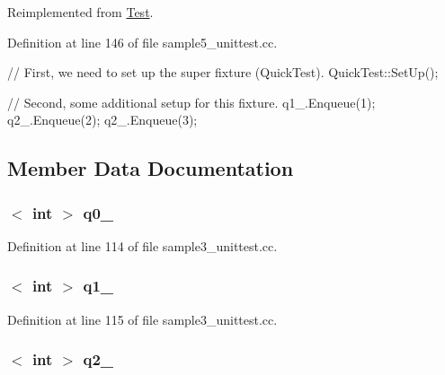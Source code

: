 \-Reimplemented from \hyperlink{classtesting_1_1Test_a1b06560e0e01a806b92c2386220d0b57}{\-Test}.



\-Definition at line 146 of file sample5\-\_\-unittest.\-cc.


\begin{DoxyCode}
                       {
    // First, we need to set up the super fixture (QuickTest).
    QuickTest::SetUp();

    // Second, some additional setup for this fixture.
    q1_.Enqueue(1);
    q2_.Enqueue(2);
    q2_.Enqueue(3);
  }
\end{DoxyCode}


\subsection{\-Member \-Data \-Documentation}
\hypertarget{classQueueTest_a2dcfad38001f7e4ec3072c6a7165070d}{
\subsubsection[{q0\-\_\-}]{$<$ int $>$ {\bf q0\-\_\-}}}\label{dc/d3d/classQueueTest_a2dcfad38001f7e4ec3072c6a7165070d}


\-Definition at line 114 of file sample3\-\_\-unittest.\-cc.

\hypertarget{classQueueTest_ab467b210bbd552ad64f773c8a91fef7d}{
\subsubsection[{q1\-\_\-}]{$<$ int $>$ {\bf q1\-\_\-}}}\label{dc/d3d/classQueueTest_ab467b210bbd552ad64f773c8a91fef7d}


\-Definition at line 115 of file sample3\-\_\-unittest.\-cc.

\hypertarget{classQueueTest_aa91a3d33874b8f83f6654b7ed77112da}{
\subsubsection[{q2\-\_\-}]{$<$ int $>$ {\bf q2\-\_\-}}}\label{dc/d3d/classQueueTest_aa91a3d33874b8f83f6654b7ed77112da}


